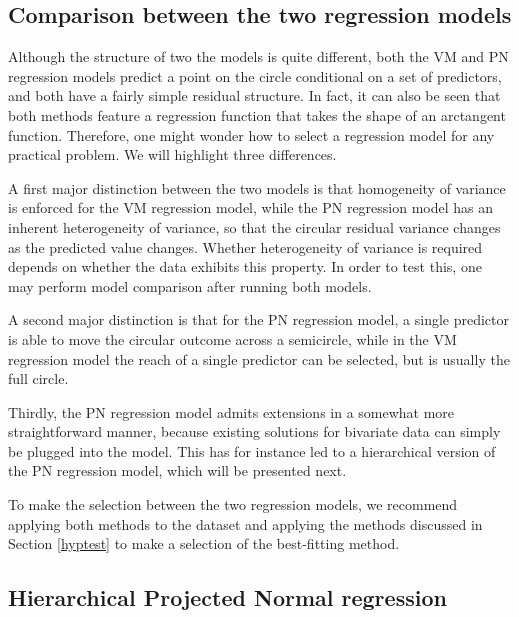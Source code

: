 \documentclass{article}
\begin{document}
		\hypertarget{comparison-between-the-two-regression-models}{%
			\subsection{Comparison between the two regression
				models}\label{comparison-between-the-two-regression-models}}
		
		Although the structure of two the models is quite different, both the VM
		and PN regression models predict a point on the circle conditional on a
		set of predictors, and both have a fairly simple residual structure. In
		fact, it can also be seen that both methods feature a regression
		function that takes the shape of an arctangent function. Therefore, one
		might wonder how to select a regression model for any practical problem.
		We will highlight three differences.
		
		A first major distinction between the two models is that homogeneity of
		variance is enforced for the VM regression model, while the PN
		regression model has an inherent heterogeneity of variance, so that the
		circular residual variance changes as the predicted value changes.
		Whether heterogeneity of variance is required depends on whether the
		data exhibits this property. In order to test this, one may perform
		model comparison after running both models.
		
		A second major distinction is that for the PN regression model, a single
		predictor is able to move the circular outcome across a semicircle,
		while in the VM regression model the reach of a single predictor can be
		selected, but is usually the full circle.
		
		Thirdly, the PN regression model admits extensions in a somewhat more
		straightforward manner, because existing solutions for bivariate data
		can simply be plugged into the model. This has for instance led to a
		hierarchical version of the PN regression model, which will be presented
		next.
		
		To make the selection between the two regression models, we recommend
		applying both methods to the dataset and applying the methods discussed
		in Section \ref{hyptest} to make a selection of the best-fitting method.
		
		\hypertarget{hierarchical-projected-normal-regression}{%
			\subsection{Hierarchical Projected Normal
				regression}\label{hierarchical-projected-normal-regression}}
		
\end{document}
